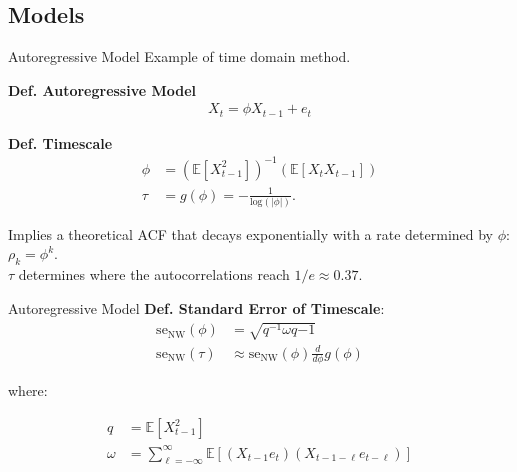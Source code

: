 \documentclass[12pt]{beamer}
\begin{document}
\subsection{Models}
\begin{frame}{Autoregressive Model}
\footnotesize
Example of time domain method.
\vspace{0.25cm}

\textbf{Def. Autoregressive Model}
\begin{align}
    X_t = \phi X_{t-1} + e_t
\end{align}

\textbf{Def. Timescale}
\begin{align}
    \phi &= (\mathbb{E}[X_{t-1}^2])^{-1}(\mathbb{E}[X_t X_{t-1}])\\
    \tau &= g(\phi) = -\frac{1}{\text{log}(|\phi|)}. \label{eq:ar1-tau}
\end{align}
\vspace{0.25cm}

Implies a theoretical ACF that decays exponentially with a rate determined by $\phi$: $\rho_k = \phi^k$.\\
\vspace{0.25cm}
$\tau$ determines where the autocorrelations reach $1/{\textit{e}} \approx 0.37$.
\end{frame}

\begin{frame}{Autoregressive Model}
\footnotesize
\textbf{Def. Standard Error of Timescale}:
\begin{align}
    \text{se}_\text{NW}(\phi) &= \sqrt{q^{-1} \omega q{-1}}\\
    \text{se}_\text{NW}(\tau) &\approx \text{se}_\text{NW}(\phi) \frac{d}{d\phi}g(\phi)
\end{align}

where:

\begin{align*}
    q &= \mathbb{E}[X_{t-1}^2]\\
    \omega &= \sum_{\ell=-\infty}^{\infty} \mathbb{E}[(X_{t-1}e_t)(X_{t-1-\ell}e_{t-\ell})]
\end{align*}
\cite{newey_simple_1987}
\end{frame}
\end{document}
